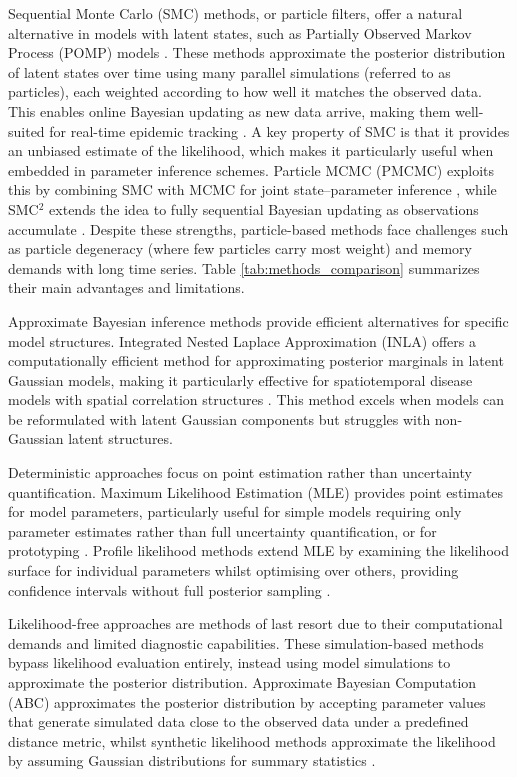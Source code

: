 \documentclass{article}
\begin{document}
Sequential Monte Carlo (SMC) methods, or particle filters, offer a natural alternative in models with latent states, such as Partially Observed Markov Process (POMP) models \citep{king2016statistical}. These methods approximate the posterior distribution of latent states over time using many parallel simulations (referred to as particles), each weighted according to how well it matches the observed data. This enables online Bayesian updating as new data arrive, making them well-suited for real-time epidemic tracking \citep{doucet2001introduction, birrell2020efficient, storvik2023sequential}. A key property of SMC is that it provides an unbiased estimate of the likelihood, which makes it particularly useful when embedded in parameter inference schemes. Particle MCMC (PMCMC) exploits this by combining SMC with MCMC for joint state–parameter inference \citep{andrieu2010particle, endo2019introduction}, while SMC$^2$ extends the idea to fully sequential Bayesian updating as observations accumulate \citep{chopin2013smc2, TEMFACK2025100847}. Despite these strengths, particle-based methods face challenges such as particle degeneracy (where few particles carry most weight) and memory demands with long time series. Table \ref{tab:methods_comparison} summarizes their main advantages and limitations.
 
Approximate Bayesian inference methods provide efficient alternatives for specific model structures.
Integrated Nested Laplace Approximation (INLA) offers a computationally efficient method for approximating posterior marginals in latent Gaussian models, making it particularly effective for spatiotemporal disease models with spatial correlation structures \citep{rue2017bayesian}.
This method excels when models can be reformulated with latent Gaussian components but struggles with non-Gaussian latent structures.

Deterministic approaches focus on point estimation rather than uncertainty quantification.
Maximum Likelihood Estimation (MLE) provides point estimates for model parameters, particularly useful for simple models requiring only parameter estimates rather than full uncertainty quantification, or for prototyping \citep{myung2003tutorial, baltazar2024maximum}.
Profile likelihood methods extend MLE by examining the likelihood surface for individual parameters whilst optimising over others, providing confidence intervals without full posterior sampling \citep{tonsing2018profile, plank2024structured}.

Likelihood-free approaches are methods of last resort due to their computational demands and limited diagnostic capabilities.
These simulation-based methods bypass likelihood evaluation entirely, instead using model simulations to approximate the posterior distribution.
Approximate Bayesian Computation (ABC) approximates the posterior distribution by accepting parameter values that generate simulated data close to the observed data under a predefined distance metric, whilst synthetic likelihood methods approximate the likelihood by assuming Gaussian distributions for summary statistics \citep{beaumont2002approximate, wood2010statistical, price2018bayesian}.
\end{document}
